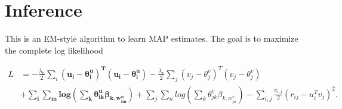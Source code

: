 \documentclass[12pt]{article}
\begin{document}
\section{Inference}
This is an EM-style algorithm to learn MAP estimates. The goal is to maximize the complete log likelihood

\begin{align*}
L &= - \frac{\lambda_u}{2} \sum_i \bm{(u_i - \theta^u_i)^T(u_i - \theta^u_i)} -\frac{\lambda_v}{2} \sum_j (v_j - \theta^v_j)^T(v_j - \theta^v_j) \\ 
&+ \bm{ \sum_i \sum_m log( \sum_k \theta^u_{ik} \beta_{k,w^u_{im}})}  + \sum_j \sum_n log( \sum_k \theta^v_{jk} \beta_{k,w^v_{jn}}) - \sum_{i,j} \frac{c_{i,j}}{2} (r_{ij} - u^T_{i} v_{j})^2.
\end{align*}
\end{document}
